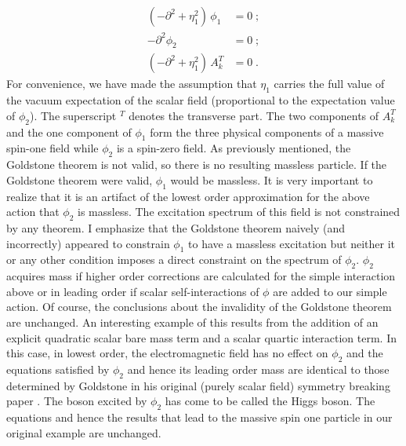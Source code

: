 \documentclass[12pt]{article}
\begin{document}
\begin{align*}
  (-\partial^2 + \eta_1^2)\, \phi_1 &= 0 \; ;\\
  -\partial^2 \phi_2 &= 0 \; ;\\
  (-\partial^2 + \eta_1^2)\, A_k^T &= 0 \; .
\end{align*}
For convenience, we have made the assumption that $\eta_1$ carries the full
value of the vacuum expectation of the scalar field (proportional to the
expectation value of $\phi_2$).  The superscript ${}^T$ denotes the transverse
part.  The two components of $A_k^T$ and the one component of $\phi_1$ form
the three physical components of a massive spin-one field while $\phi_2$ is a
spin-zero field. As previously mentioned, the Goldstone theorem is not valid,
so there is no resulting massless particle. If the Goldstone theorem were
valid, $\phi_1$ would be massless. It is very important to realize that it is
an artifact of the lowest order approximation for the above action that
$\phi_2$ is massless. The excitation spectrum of this field is not constrained
by any theorem. I emphasize that the Goldstone theorem naively (and
incorrectly) appeared to constrain $\phi_1$ to have a massless excitation but
neither it or any other condition imposes a direct constraint on the spectrum
of $\phi_2$. $\phi_2$ acquires mass if higher order corrections are calculated
for the simple interaction above or in leading order if scalar
self-interactions of $\phi$ are added to our simple action. Of course, the conclusions
about the invalidity of the Goldstone theorem are unchanged. An interesting
example of this results from the addition of an explicit quadratic scalar bare mass term and
a scalar quartic interaction term. In this case, in lowest order, the electromagnetic field
has no effect on $\phi_2$ and the equations satisfied by $\phi_2$ and hence its
leading order mass are identical to those determined by Goldstone in his
original (purely scalar field) symmetry breaking paper \cite{jg;1961}. The
boson excited by $\phi_2$ has come to be called the Higgs boson. The equations
and hence the results that lead to the massive spin one particle in our
original example are unchanged.
\end{document}
